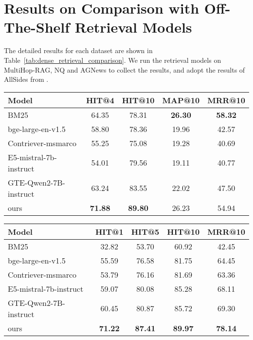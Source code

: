 \section{Results on Comparison with Off-The-Shelf Retrieval Models}
\label{sec:detailed_dense_comparison}
The detailed results for each dataset are shown in Table~\ref{tab:dense_retrieval_comparison}. We run the retrieval models on MultiHop-RAG, NQ and AGNews to collect the results, and adopt the results of AllSides from \citet{DBLP:journals/corr/abs-2405-02714}.


\begin{table*}[htbp]
    \centering
    \small
    \begin{subtable}[t]{\textwidth}
        \centering
        \begin{tabular}{lcccc}
        \toprule
        \textbf{Model} & \textbf{HIT@4} & \textbf{HIT@10} & \textbf{MAP@10} & \textbf{MRR@10}\\
         \midrule
         BM25 & 64.35 & 78.31 & \bf 26.30 & \bf 58.32 \\
         bge-large-en-v1.5 & 58.80 & 78.36 & 19.96 & 42.57 \\
         Contriever-msmarco & 55.25 & 75.08 & 19.28 & 40.69 \\
         E5-mistral-7b-instruct & 54.01 & 79.56 & 19.11 & 40.77 \\
         GTE-Qwen2-7B-instruct & 63.24 & 83.55 & 22.02 & 47.50 \\
         ours & \bf 71.88 & \bf 89.80& 26.23& 54.94\\
         \bottomrule
        \end{tabular}
        \caption{MultiHop-RAG}
    \end{subtable}
    \vspace{0.2cm}
    
    \begin{subtable}[t]{\textwidth}
        \centering
        \begin{tabular}{lcccc}
        \toprule
        \textbf{Model} & \textbf{HIT@1} & \textbf{HIT@5} & \textbf{HIT@10} & \textbf{MRR@10}\\
         \midrule
         BM25 & 32.82 & 53.70 & 60.92 & 42.45 \\
         bge-large-en-v1.5 & 55.59 & 76.58 & 81.75 & 64.45 \\
         Contriever-msmarco & 53.79 & 76.16 & 81.69 & 63.36 \\
         E5-mistral-7b-instruct & 59.07 & 80.08 & 85.28 & 68.11 \\
         GTE-Qwen2-7B-instruct & 60.45 & 80.87 & 85.72 & 69.30 \\
         ours & \bf 71.22& \bf 87.41& \bf 89.97& \bf 78.14\\
         \bottomrule
        \end{tabular}
        \caption{NQ}
    \end{subtable}
    \vspace{0.2cm}


\end{table*}
